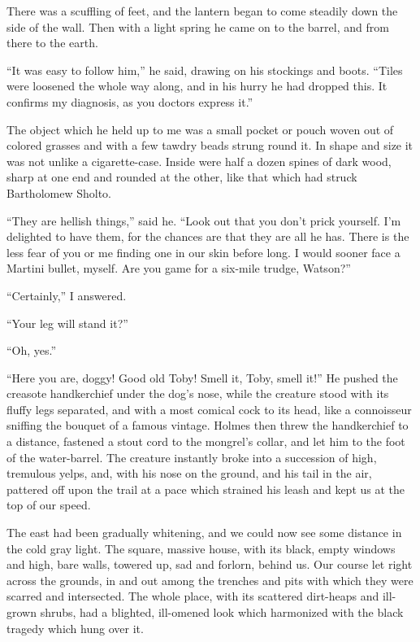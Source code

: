 \documentclass[12pt,english,oneside]{book}
\begin{document}
There was a scuffling of feet, and the lantern began to come steadily
down the side of the wall. Then with a light spring he came on to
the barrel, and from there to the earth.

{}``It was easy to follow him,'' he said, drawing on his stockings
and boots. {}``Tiles were loosened the whole way along, and in his
hurry he had dropped this. It confirms my diagnosis, as you doctors
express it.''

The object which he held up to me was a small pocket or pouch woven
out of colored grasses and with a few tawdry beads strung round it.
In shape and size it was not unlike a cigarette-case. Inside were
half a dozen spines of dark wood, sharp at one end and rounded at
the other, like that which had struck Bartholomew Sholto.

{}``They are hellish things,'' said he. {}``Look out that you don't
prick yourself. I'm delighted to have them, for the chances are that
they are all he has. There is the less fear of you or me finding one
in our skin before long. I would sooner face a Martini bullet, myself.
Are you game for a six-mile trudge, Watson?''

{}``Certainly,'' I answered.

{}``Your leg will stand it?''

{}``Oh, yes.''

{}``Here you are, doggy! Good old Toby! Smell it, Toby, smell it!''
He pushed the creasote handkerchief under the dog's nose, while the
creature stood with its fluffy legs separated, and with a most comical
cock to its head, like a connoisseur sniffing the bouquet of a famous
vintage. Holmes then threw the handkerchief to a distance, fastened
a stout cord to the mongrel's collar, and let him to the foot of the
water-barrel. The creature instantly broke into a succession of high,
tremulous yelps, and, with his nose on the ground, and his tail in
the air, pattered off upon the trail at a pace which strained his
leash and kept us at the top of our speed.

The east had been gradually whitening, and we could now see some distance
in the cold gray light. The square, massive house, with its black,
empty windows and high, bare walls, towered up, sad and forlorn, behind
us. Our course let right across the grounds, in and out among the
trenches and pits with which they were scarred and intersected. The
whole place, with its scattered dirt-heaps and ill-grown shrubs, had
a blighted, ill-omened look which harmonized with the black tragedy
which hung over it.
\end{document}

